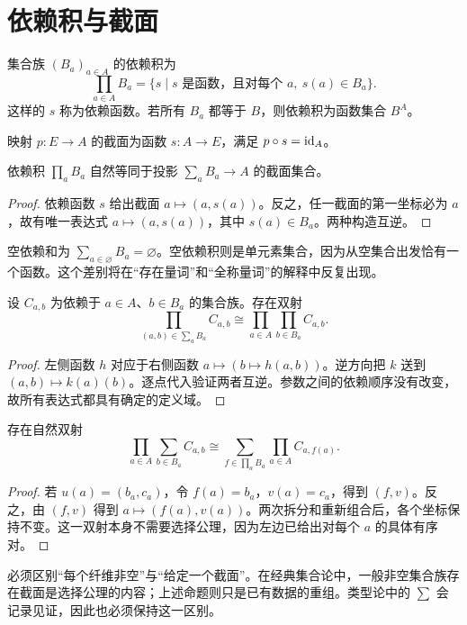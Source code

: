 \section{依赖积与截面}
\begin{definition}[依赖积]
集合族 $(B_a)_{a\in A}$ 的依赖积为
\[
\prod_{a\in A}B_a
=\{s\mid s\text{ 是函数，且对每个 }a,\ s(a)\in B_a\}.
\]
这样的 $s$ 称为依赖函数。若所有 $B_a$ 都等于 $B$，则依赖积为函数集合 $B^A$。
\end{definition}
\begin{definition}[截面]
映射 $p:E\to A$ 的截面为函数 $s:A\to E$，满足 $p\circ s=\operatorname{id}_A$。
\end{definition}
\begin{proposition}
依赖积 $\prod_a B_a$ 自然等同于投影 $\sum_a B_a\to A$ 的截面集合。
\end{proposition}
\begin{proof}
依赖函数 $s$ 给出截面 $a\mapsto(a,s(a))$。反之，任一截面的第一坐标必为 $a$，故有唯一表达式 $a\mapsto(a,s(a))$，其中 $s(a)\in B_a$。两种构造互逆。
\end{proof}
\begin{example}[空指标]
空依赖和为 $\sum_{a\in\varnothing}B_a=\varnothing$。空依赖积则是单元素集合，因为从空集合出发恰有一个函数。这个差别将在“存在量词”和“全称量词”的解释中反复出现。
\end{example}
\begin{proposition}[依赖柯里化]
设 $C_{a,b}$ 为依赖于 $a\in A$、$b\in B_a$ 的集合族。存在双射
\[
\prod_{(a,b)\in\sum_aB_a}C_{a,b}
\cong \prod_{a\in A}\prod_{b\in B_a}C_{a,b}.
\]
\end{proposition}
\begin{proof}
左侧函数 $h$ 对应于右侧函数 $a\mapsto(b\mapsto h(a,b))$。逆方向把 $k$ 送到 $(a,b)\mapsto k(a)(b)$。逐点代入验证两者互逆。参数之间的依赖顺序没有改变，故所有表达式都具有确定的定义域。
\end{proof}
\begin{proposition}[依赖选择的有序对公式]
存在自然双射
\[
\prod_{a\in A}\sum_{b\in B_a}C_{a,b}
\cong
\sum_{f\in\prod_a B_a}\prod_{a\in A} C_{a,f(a)}.
\]
\end{proposition}
\begin{proof}
若 $u(a)=(b_a,c_a)$，令 $f(a)=b_a$，$v(a)=c_a$，得到 $(f,v)$。反之，由 $(f,v)$ 得到 $a\mapsto(f(a),v(a))$。两次拆分和重新组合后，各个坐标保持不变。这一双射本身不需要选择公理，因为左边已给出对每个 $a$ 的具体有序对。
\end{proof}
\begin{remark}
必须区别“每个纤维非空”与“给定一个截面”。在经典集合论中，一般非空集合族存在截面是选择公理的内容；上述命题则只是已有数据的重组。类型论中的 $\sum$ 会记录见证，因此也必须保持这一区别。
\end{remark}

